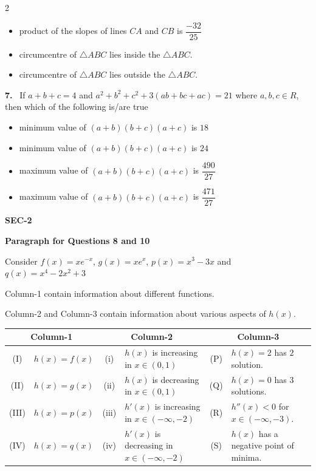 \documentclass[10pt]{extarticle}
\newcommand{\sect}[1]{\par\smallskip\noindent\textbf{#1}\par}
\newcommand{\qn}[1]{\par\smallskip\noindent\textbf{#1.}~}
\newcommand{\paraq}[2]{\par\smallskip\noindent\textbf{Paragraph for Questions #1 and #2}\par}
\newenvironment{qoptions}{\begin{itemize}[leftmargin=1.8em,itemsep=1pt,topsep=2pt,label={}]}{\end{itemize}}
\newcommand{\opt}[2]{\item[(#1)] #2}
\begin{document}
\begin{multicols}{2}
\begin{qoptions}
\opt{B}{product of the slopes of lines $CA$ and $CB$ is $\dfrac{-32}{25}$}
\opt{C}{circumcentre of $\triangle ABC$ lies inside the $\triangle ABC$.}
\opt{D}{circumcentre of $\triangle ABC$ lies outside the $\triangle ABC$.}
\end{qoptions}
\qn{7} If $a+b+c=4$ and $a^2+b^2+c^2+3(ab+bc+ac)=21$ where $a,b,c\in R$, then which of the following is/are true
\begin{qoptions}
\opt{A}{minimum value of $(a+b)(b+c)(a+c)$ is $18$}
\opt{B}{minimum value of $(a+b)(b+c)(a+c)$ is $24$}
\opt{C}{maximum value of $(a+b)(b+c)(a+c)$ is $\dfrac{490}{27}$}
\opt{D}{maximum value of $(a+b)(b+c)(a+c)$ is $\dfrac{471}{27}$}
\end{qoptions}
\sect{SEC-2}
\paraq{8}{10}
Consider $f(x)=xe^{-x}$, $g(x)=xe^{x}$, $p(x)=x^3-3x$ and $q(x)=x^4-2x^2+3$

Column-1 contain information about different functions.

Column-2 and Column-3 contain information about various aspects of $h(x)$.

\end{multicols}
\begin{center}\small\setlength{\tabcolsep}{4pt}
\begin{tabular}{|c|p{3cm}|c|p{4.5cm}|c|p{5cm}|}\hline
\multicolumn{2}{|c|}{Column-1} & \multicolumn{2}{c|}{Column-2} & \multicolumn{2}{c|}{Column-3}\\\hline
(I) & $h(x)=f(x)$ & (i) & $h(x)$ is increasing in $x\in(0,1)$ & (P) & $h(x)=2$ has $2$ solution.\\\hline
(II) & $h(x)=g(x)$ & (ii) & $h(x)$ is decreasing in $x\in(0,1)$ & (Q) & $h(x)=0$ has $3$ solutions.\\\hline
(III) & $h(x)=p(x)$ & (iii) & $h'(x)$ is increasing in $x\in(-\infty,-2)$ & (R) & $h''(x)<0$ for $x\in(-\infty,-3)$.\\\hline
(IV) & $h(x)=q(x)$ & (iv) & $h'(x)$ is decreasing in $x\in(-\infty,-2)$ & (S) & $h(x)$ has a negative point of minima.\\\hline
\end{tabular}
\end{center}
\end{document}
